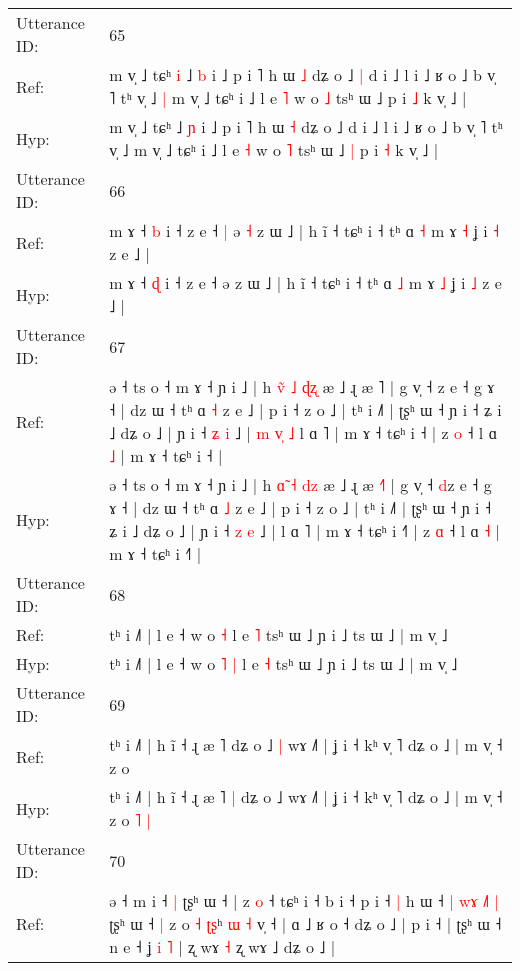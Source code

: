 \documentclass[10pt]{article}
\DeclareRobustCommand{\hl}[1]{{\textcolor{red}{#1}}}
\begin{document}
\begin{longtable}{ll}
Utterance ID: & 65 \\
Ref: & m v̩ ˩ tɕʰ\hl{ }\hl{i} ˩ \hl{b} i ˩ p i ˥ h ɯ \hl{˩} dʑ o ˩\hl{ }\hl{|} d i ˩ l i ˩ ʁ o ˩ b v̩ ˥ tʰ v̩ ˩\hl{ }\hl{|} m v̩ ˩ tɕʰ i ˩ l e \hl{˥} w o \hl{˩} tsʰ ɯ ˩\hl{}\hl{} p i \hl{˩} k v̩ ˩ |
 \\
Hyp: & m v̩ ˩ tɕʰ\hl{}\hl{} ˩ \hl{ɲ} i ˩ p i ˥ h ɯ \hl{˧} dʑ o ˩\hl{}\hl{} d i ˩ l i ˩ ʁ o ˩ b v̩ ˥ tʰ v̩ ˩\hl{}\hl{} m v̩ ˩ tɕʰ i ˩ l e \hl{˧} w o \hl{˥} tsʰ ɯ ˩\hl{ }\hl{|} p i \hl{˧} k v̩ ˩ |
 \\
\midrule
Utterance ID: & 66 \\
Ref: & m ɤ ˧ \hl{b} i ˧ z e ˧\hl{ }\hl{|} ə\hl{ }\hl{˧} z ɯ ˩ | h ĩ ˧ tɕʰ i ˧ tʰ ɑ \hl{˧} m ɤ \hl{˧} ʝ i \hl{˧} z e ˩ |
 \\
Hyp: & m ɤ ˧ \hl{ɖ} i ˧ z e ˧\hl{}\hl{} ə\hl{}\hl{} z ɯ ˩ | h ĩ ˧ tɕʰ i ˧ tʰ ɑ \hl{˩} m ɤ \hl{˩} ʝ i \hl{˩} z e ˩ |
 \\
\midrule
Utterance ID: & 67 \\
Ref: & ə ˧ ts o ˧ m ɤ ˧ ɲ i ˩ | h \hl{v}̃ \hl{˩} \hl{ɖ}\hl{ʐ} æ ˩ ɻ æ \hl{}˥ | g v̩ ˧ \hl{}z e ˧ g ɤ ˧ | dz ɯ ˧ tʰ ɑ \hl{˧} z e ˩ | p i ˧ z o ˩ | tʰ i ˩˥ | ʈʂʰ ɯ ˧ ɲ i ˧ ʑ i ˩ dʑ o ˩ | ɲ i ˧ \hl{ʑ} \hl{i} ˩ |\hl{ }\hl{m}\hl{ }\hl{v}\hl{̩}\hl{ }\hl{˩} l ɑ ˥ | m ɤ ˧ tɕʰ i ˧\hl{} | z \hl{o} ˧ l ɑ \hl{˩} | m ɤ ˧ tɕʰ i ˧\hl{} |
 \\
Hyp: & ə ˧ ts o ˧ m ɤ ˧ ɲ i ˩ | h \hl{ɑ}̃ \hl{˧} \hl{d}\hl{z} æ ˩ ɻ æ \hl{˧}˥ | g v̩ ˧ \hl{d}z e ˧ g ɤ ˧ | dz ɯ ˧ tʰ ɑ \hl{˩} z e ˩ | p i ˧ z o ˩ | tʰ i ˩˥ | ʈʂʰ ɯ ˧ ɲ i ˧ ʑ i ˩ dʑ o ˩ | ɲ i ˧ \hl{z} \hl{e} ˩ |\hl{}\hl{}\hl{}\hl{}\hl{}\hl{}\hl{} l ɑ ˥ | m ɤ ˧ tɕʰ i ˧\hl{˥} | z \hl{ɑ} ˧ l ɑ \hl{˧} | m ɤ ˧ tɕʰ i ˧\hl{˥} |
 \\
\midrule
Utterance ID: & 68 \\
Ref: & tʰ i ˩˥ | l e ˧ w o\hl{}\hl{} \hl{˧} l e \hl{˥} tsʰ ɯ ˩ ɲ i ˩ ts ɯ ˩ | m v̩ ˩
 \\
Hyp: & tʰ i ˩˥ | l e ˧ w o\hl{ }\hl{˥} \hl{|} l e \hl{˧} tsʰ ɯ ˩ ɲ i ˩ ts ɯ ˩ | m v̩ ˩
 \\
\midrule
Utterance ID: & 69 \\
Ref: & tʰ i ˩˥ | h ĩ ˧ ɻ æ ˥\hl{}\hl{} dʑ o ˩\hl{ }\hl{|} wɤ ˩˥ | ʝ i ˧ kʰ v̩ ˥ dʑ o ˩ | m v̩ ˧ z o\hl{}\hl{}\hl{}\hl{}
 \\
Hyp: & tʰ i ˩˥ | h ĩ ˧ ɻ æ ˥\hl{ }\hl{|} dʑ o ˩\hl{}\hl{} wɤ ˩˥ | ʝ i ˧ kʰ v̩ ˥ dʑ o ˩ | m v̩ ˧ z o\hl{ }\hl{˥}\hl{ }\hl{|}
 \\
\midrule
Utterance ID: & 70 \\
Ref: & ə ˧ m i ˧\hl{ }\hl{|} ʈʂʰ ɯ ˧\hl{}\hl{}\hl{}\hl{}\hl{} | z \hl{o} ˧ tɕʰ i ˧ b i ˧ p i ˧\hl{ }\hl{|} h ɯ ˧\hl{ }\hl{|}\hl{ }\hl{w}\hl{ɤ}\hl{ }\hl{˩}\hl{˥}\hl{ }\hl{|} ʈʂʰ ɯ ˧\hl{ }\hl{|} z o \hl{˧} \hl{ʈ}\hl{ʂ}ʰ \hl{}\hl{ɯ} \hl{˧} v̩ ˧ | ɑ ˩ ʁ o ˧ dʑ o ˩ | p i ˧ | ʈʂʰ ɯ ˧ n e ˧ ʝ \hl{i} \hl{˥} | ʐ wɤ\hl{}\hl{} \hl{˧} ʐ wɤ ˩\hl{}\hl{} dʑ o ˩ |

\end{longtable}
\end{document}
